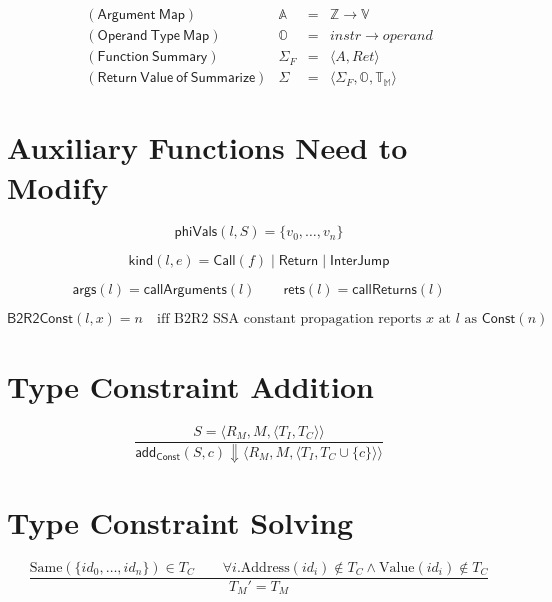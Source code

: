 \documentclass{article}
\newcommand{\addC}{\mathsf{add_{Const}}}
\newcommand{\bconst}{\mathsf{B2R2Const}}
\begin{document}
\[
\begin{array}{lrcl}
\mathsf{(Argument \ Map)} & \mathbb{A}  & = & \mathbb{Z} \rightarrow \mathbb{V}\\[2mm]
\mathsf{(Operand \ Type \ Map)} & \mathbb{O}  & = & instr \rightarrow operand\\[2mm]
\mathsf{(Function \ Summary)} & \Sigma_F    & = & \langle A, Ret\rangle\\[2mm]
\mathsf{(Return \ Value \ of \ Summarize)}    & \Sigma      & = & \langle \Sigma_F,\mathbb{O},\mathbb{T}_\mathbb{M}\rangle
\end{array}
\]

\section{Auxiliary Functions Need to Modify}

\[
\mathsf{phiVals}(l,S)=\{v_0,\ldots,v_n\}
\]

\[
\mathsf{kind}(l,e)=\mathsf{Call}(f)\mid\mathsf{Return}\mid\mathsf{InterJump}
\]

\[
\mathsf{args}(l)=\mathsf{callArguments}(l)
\qquad
\mathsf{rets}(l)=\mathsf{callReturns}(l)
\]

\[
\bconst(l,x)=n
\quad\text{iff B2R2 SSA constant propagation reports }
x\text{ at }l\text{ as }\mathsf{Const}(n)
\]

\section{Type Constraint Addition}

\[
\frac{
    S=\langle R_M,M,\langle T_I,T_C\rangle\rangle
}{
    \addC(S,c) \Downarrow \langle R_M,M,\langle T_I,T_C\cup\{c\}\rangle\rangle
}
\]

\section{Type Constraint Solving}

\[
\frac{
    \mathrm{Same}(\{id_0,\ldots,id_n\})\in T_C
    \qquad
    \forall i. \mathrm{Address}(id_i) \notin T_C \land \mathrm{Value}(id_i) \notin T_C
}{
    T_M' = T_M
}
\]
\end{document}
